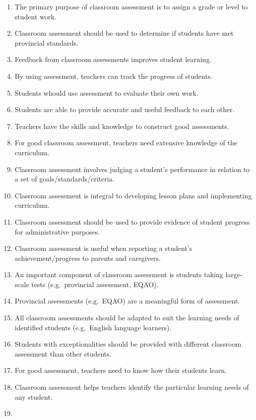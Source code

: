 \documentclass[
]{book}
\providecommand{\tightlist}{%
  \setlength{\itemsep}{0pt}\setlength{\parskip}{0pt}}
\begin{document}
\begin{enumerate}
\def\labelenumi{\arabic{enumi}.}
\tightlist
\item
  The primary purpose of classroom assessment is to assign a grade or level to student work.
\item
  Classroom assessment should be used to determine if students have met provincial standards.
\item
  Feedback from classroom assessments improves student learning.
\item
  By using assessment, teachers can track the progress of students.
\item
  Students whould use assessment to evaluate their own work.
\item
  Students are able to provide accurate and useful feedback to each other.
\item
  Teachers have the skills and knowledge to construct good assessments.
\item
  For good classroom assessment, teachers need extensive knowledge of the curriculum.
\item
  Classroom assessment involves judging a student's performance in relation to a set of goals/standards/criteria.
\item
  Classroom assessment is integral to developing lesson plans and implementing curriculum.
\item
  Classroom assessment should be used to provide evidence of student progress for administrative purposes.
\item
  Classroom assessment is useful when reporting a student's achievement/progress to parents and caregivers.
\item
  An important component of classroom assessment is students taking large-scale tests (e.g.~provincial assessment, EQAO).
\item
  Provincial assessments (e.g.~EQAO) are a meaningful form of assessment.
\item
  All classroom assessments should be adapted to suit the learning needs of identified students (e.g.~English language learners).
\item
  Students with exceptionalities should be provided with different classroom assessment than other students.
\item
  For good assessment, teachers need to know how their students learn.
\item
  Classroom assessment helps teachers identify the particular learning needs of any student.
\item

\end{enumerate}
\end{document}

